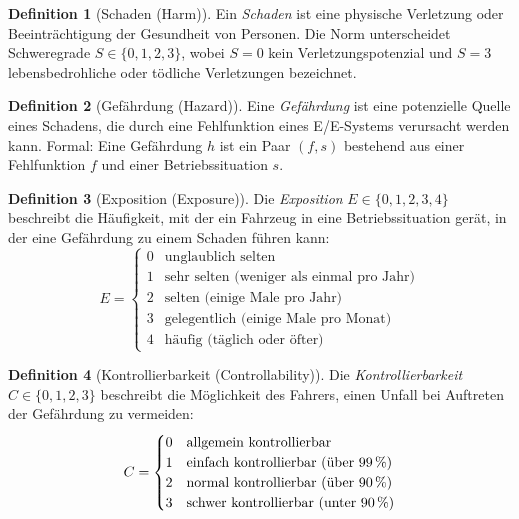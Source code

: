 ﻿\documentclass[a4paper,12pt]{article}
\theoremstyle{definition}
\newtheorem{definition}{Definition}
\begin{document}
\begin{definition}[Schaden (Harm)]
  Ein \emph{Schaden} ist eine physische Verletzung oder Beeinträchtigung
  der Gesundheit von Personen. Die Norm unterscheidet Schweregrade
  $S \in \{0, 1, 2, 3\}$, wobei $S=0$ kein Verletzungspotenzial und
  $S=3$ lebensbedrohliche oder tödliche Verletzungen bezeichnet.
\end{definition}

\begin{definition}[Gefährdung (Hazard)]
  Eine \emph{Gefährdung} ist eine potenzielle Quelle eines Schadens,
  die durch eine Fehlfunktion eines E/E-Systems verursacht werden kann.
  Formal: Eine Gefährdung $h$ ist ein Paar $(f, s)$ bestehend aus einer
  Fehlfunktion $f$ und einer Betriebssituation $s$.
\end{definition}

\begin{definition}[Exposition (Exposure)]
  Die \emph{Exposition} $E \in \{0, 1, 2, 3, 4\}$ beschreibt die
  Häufigkeit, mit der ein Fahrzeug in eine Betriebssituation gerät,
  in der eine Gefährdung zu einem Schaden führen kann:
  \[
    E = \begin{cases}
      0 & \text{unglaublich selten} \\
      1 & \text{sehr selten (weniger als einmal pro Jahr)} \\
      2 & \text{selten (einige Male pro Jahr)} \\
      3 & \text{gelegentlich (einige Male pro Monat)} \\
      4 & \text{häufig (täglich oder öfter)}
    \end{cases}
  \]
\end{definition}

\begin{definition}[Kontrollierbarkeit (Controllability)]
  Die \emph{Kontrollierbarkeit} $C \in \{0, 1, 2, 3\}$ beschreibt die
  Möglichkeit des Fahrers, einen Unfall bei Auftreten der Gefährdung
  zu vermeiden:
  \[
    C = \begin{cases}
      0 & \text{allgemein kontrollierbar} \\
      1 & \text{einfach kontrollierbar (über 99\,\%)} \\
      2 & \text{normal kontrollierbar (über 90\,\%)} \\
      3 & \text{schwer kontrollierbar (unter 90\,\%)}
    \end{cases}
  \]
\end{definition}
\end{document}
